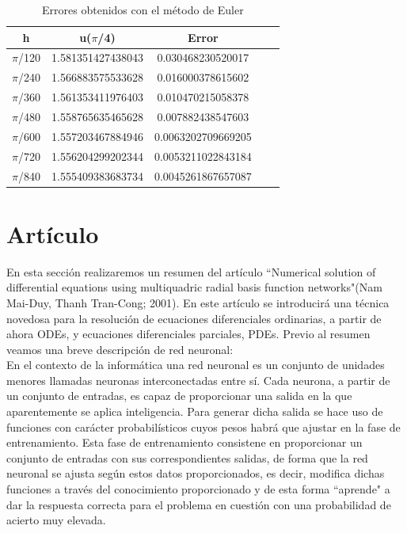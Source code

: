\documentclass[12pt]{article}       %
\begin{document}
    \begin{table}[H]
        \centering
        \setlength\extrarowheight{3pt}
        
        \begin{tabular}{|c|c|c|c|c}
            \hline
            \textbf{h} & {\textbf{u($\pi$/4)}} & \textbf{Error} \\ 
            \hline
                $\pi$/120 & 1.581351427438043 & 0.030468230520017\\
            \hline
                $\pi$/240 & 1.566883575533628 & 0.016000378615602\\
            \hline
                $\pi$/360 & 1.561353411976403 & 0.010470215058378\\
            \hline
                $\pi$/480 & 1.558765635465628 & 0.007882438547603\\
            \hline
                $\pi$/600 & 1.557203467884946 & 0.0063202709669205\\
            \hline
                $\pi$/720 &  1.556204299202344 & 0.0053211022843184\\
            \hline
                $\pi$/840 & 1.555409383683734 & 0.0045261867657087\\
            \hline
        \end{tabular}
        
        \caption{Errores obtenidos con el método de Euler}           
    \end{table}


\section{Artículo}

En esta sección realizaremos un resumen del artículo ``Numerical solution of differential equations using multiquadric radial basis function networks"(Nam Mai-Duy, Thanh Tran-Cong; 2001). En este artículo se introducirá una técnica novedosa para la resolución de ecuaciones diferenciales ordinarias, a partir de ahora ODEs, y ecuaciones diferenciales parciales, PDEs. Previo al resumen veamos una breve descripción de red neuronal:\\

En el contexto de la informática una red neuronal es un conjunto de unidades menores llamadas neuronas interconectadas entre sí. Cada neurona, a partir de un conjunto de entradas, es capaz de proporcionar una salida en la que aparentemente se aplica inteligencia. Para generar dicha salida se hace uso de funciones con carácter probabilísticos cuyos pesos habrá que ajustar en la fase de entrenamiento. Esta fase de entrenamiento consistene en proporcionar un conjunto de entradas con sus correspondientes salidas, de forma que la red neuronal se ajusta según estos datos proporcionados, es decir, modifica dichas funciones a través del conocimiento proporcionado y de esta forma ``aprende" a dar la respuesta correcta para el problema en cuestión con una probabilidad de acierto muy elevada.\\
\end{document}
